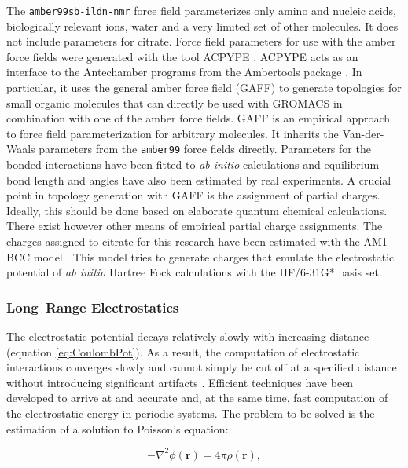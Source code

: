 \documentclass[english, a4paper, 12pt, titlepage, draft]{article}
\newcommand{\vect}[1]{\mathbf{#1}}
\begin{document}
The \texttt{amber99sb-ildn-nmr} force field parameterizes only amino and nucleic acids, biologically relevant ions, water and a very limited set of other molecules.
It does not include parameters for citrate.
Force field parameters for use with the amber force fields were generated with the tool ACPYPE \cite{ACPYPE}.
ACPYPE acts as an interface to the Antechamber programs from the Ambertools package \cite{antechamber}.
In particular, it uses the general amber force field (GAFF) \cite{GAFF} to generate topologies for small organic molecules that can directly be used with GROMACS in combination with one of the amber force fields.
GAFF is an empirical approach to force field parameterization for arbitrary molecules.
It inherits the Van-der-Waals parameters from the \texttt{amber99} force fields directly.
Parameters for the bonded interactions have been fitted to \textit{ab initio} calculations and equilibrium bond length and angles have also been estimated by real experiments.
A crucial point in topology generation with GAFF is the assignment of partial charges.
Ideally, this should be done based on elaborate quantum chemical calculations.
There exist however other means of empirical partial charge assignments.
The charges assigned to citrate for this research have been estimated with the AM1-BCC model \cite{am1bcc_method, am1bcc_validation}.
This model tries to generate charges that emulate the electrostatic potential of \textit{ab initio} Hartree Fock calculations with the HF/6-31G* basis set.



\subsubsection{Long--Range Electrostatics}
\label{sec:PME}

The electrostatic potential decays relatively slowly with increasing distance (equation \ref{eq:CoulombPot}).
As a result, the computation of electrostatic interactions converges slowly and cannot simply be cut off at a specified distance without introducing significant artifacts \cite{FrenkelSmit}.
Efficient techniques have been developed to arrive at and accurate and, at the same time, fast computation of the electrostatic energy in periodic systems.
The problem to be solved is the estimation of a solution to Poisson's equation:

\begin{equation}
    -\nabla^2 \phi(\vect{r}) = 4 \pi \rho(\vect{r}),
\end{equation}
\end{document}
